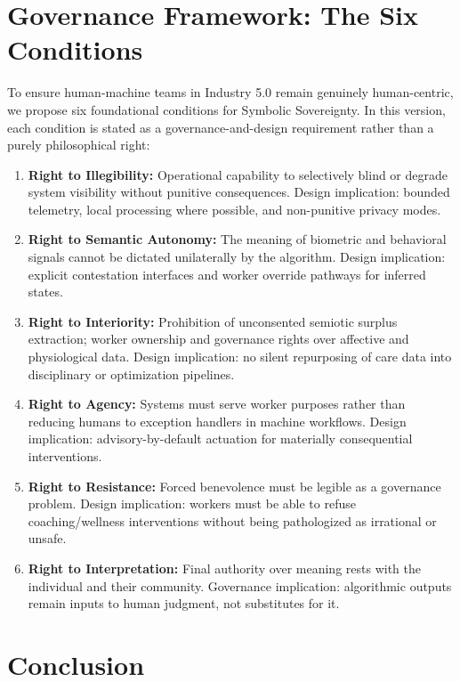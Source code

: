 \documentclass[11pt, a4paper]{article}
\begin{document}
\section{Governance Framework: The Six Conditions}

To ensure human-machine teams in Industry 5.0 remain genuinely human-centric, we propose six foundational conditions for Symbolic Sovereignty. In this version, each condition is stated as a governance-and-design requirement rather than a purely philosophical right:

\begin{enumerate}
    \item \textbf{Right to Illegibility:} Operational capability to selectively blind or degrade system visibility without punitive consequences. Design implication: bounded telemetry, local processing where possible, and non-punitive privacy modes.
    \item \textbf{Right to Semantic Autonomy:} The meaning of biometric and behavioral signals cannot be dictated unilaterally by the algorithm. Design implication: explicit contestation interfaces and worker override pathways for inferred states.
    \item \textbf{Right to Interiority:} Prohibition of unconsented semiotic surplus extraction; worker ownership and governance rights over affective and physiological data. Design implication: no silent repurposing of care data into disciplinary or optimization pipelines.
    \item \textbf{Right to Agency:} Systems must serve worker purposes rather than reducing humans to exception handlers in machine workflows. Design implication: advisory-by-default actuation for materially consequential interventions.
    \item \textbf{Right to Resistance:} Forced benevolence must be legible as a governance problem. Design implication: workers must be able to refuse coaching/wellness interventions without being pathologized as irrational or unsafe.
    \item \textbf{Right to Interpretation:} Final authority over meaning rests with the individual and their community. Governance implication: algorithmic outputs remain inputs to human judgment, not substitutes for it.
\end{enumerate}

\section{Conclusion}
\end{document}

